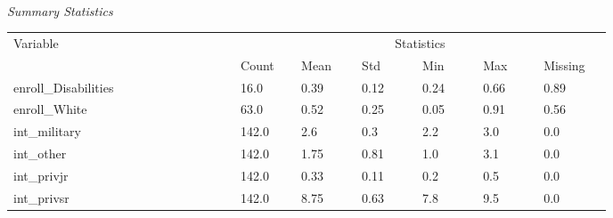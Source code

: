 \documentclass[10pt]{beamer}
\begin{document}
\begin{frame}
    \begin{threeparttable}
        \renewcommand\thetable{2}
        \caption{\\\textit{Summary Statistics}}
        \begin{tabular}{ p{0.3\linewidth} p{0.08\linewidth} p{0.08\linewidth} p{0.08\linewidth} p{0.08\linewidth} p{0.08\linewidth} p{0.09\linewidth}}
            \toprule
            Variable & \multicolumn{6}{c}{Statistics} \\
            \cmidrule(r){2-7}
            &    Count   &   Mean & Std & Min & Max & Missing  \\ 
            \midrule
            enroll\_Disabilities &  16.0  &  0.39 & 0.12 & 0.24 & 0.66 & 0.89  \\ 
            enroll\_White &  63.0  &  0.52 & 0.25 & 0.05 & 0.91 & 0.56  \\ 
            int\_military &  142.0  &  2.6 & 0.3 & 2.2 & 3.0 & 0.0  \\ 
            int\_other &  142.0  &  1.75 & 0.81 & 1.0 & 3.1 & 0.0  \\
            int\_privjr &  142.0  &  0.33 & 0.11 & 0.2 & 0.5 & 0.0  \\
            int\_privsr &  142.0  &  8.75 & 0.63 & 7.8 & 9.5 & 0.0  \\ 
            \midrule
        \end{tabular}
        \end{threeparttable}
\end{frame}
\end{document}
